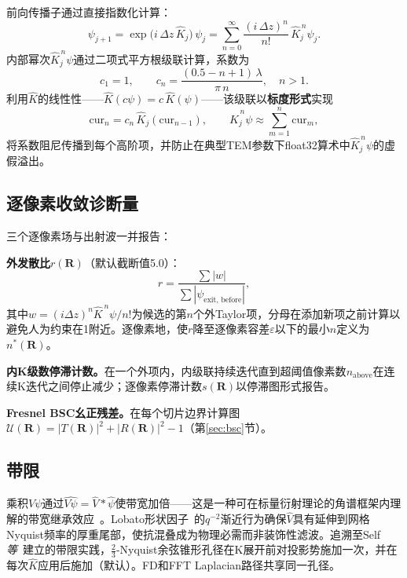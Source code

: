 \documentclass[twoside,11pt]{ctexart}
\begin{document}
前向传播子通过直接指数化计算：
\begin{equation}\label{eq:taylor}
\psi_{j+1}=\exp\!\big(i\,\Delta z\,\hat{K}_j\big)\,\psi_j
=\sum_{n=0}^{\infty}\frac{(i\,\Delta z)^n}{n!}\,\hat{K}_j^{\,n}\psi_j.
\end{equation}
内部幂次$\hat{K}_j^{\,n}\psi$通过二项式平方根级联计算，系数为
\begin{equation}\label{eq:cn}
c_1=1,\qquad c_n=\frac{(0.5-n+1)\,\lambda}{\pi\,n},\quad n>1.
\end{equation}
利用$\hat{K}$的线性性——$\hat{K}(c\psi)=c\,\hat{K}(\psi)$——该级联以\textbf{标度形式}实现
\begin{equation}\label{eq:cascade}
\mathrm{cur}_n=c_n\,\hat{K}_j(\mathrm{cur}_{n-1}),\qquad
\hat{K}_j^{\,n}\psi\approx\sum_{m=1}^{n}\mathrm{cur}_m,
\end{equation}
将系数阻尼传播到每个高阶项，并防止在典型TEM参数下float32算术中$\hat{K}_j^{\,n}\psi$的虚假溢出。

\subsection{逐像素收敛诊断量}

三个逐像素场与出射波一并报告：

\textbf{外发散比}$r(\mathbf{R})$（默认截断值5.0）：
\begin{equation}\label{eq:divergence-ratio}
r=\frac{\sum|w|}{\sum|\psi_{\text{exit, before}}|},
\end{equation}
其中$w=(i\Delta z)^n\hat{K}^{\,n}\psi/n!$为候选的第$n$个外Taylor项，分母在添加新项之前计算以避免人为约束在1附近。逐像素地，使$r$降至逐像素容差$\varepsilon$以下的最小$n$定义为$n^*(\mathbf{R})$。

\textbf{内K级数停滞计数。}在一个外项内，内级联持续迭代直到超阈值像素数$n_\text{above}$在连续K迭代之间停止减少；逐像素停滞计数$s(\mathbf{R})$以停滞图形式报告。

\textbf{Fresnel BSC幺正残差。}在每个切片边界计算图$\mathcal{U}(\mathbf{R})=|T(\mathbf{R})|^2+|R(\mathbf{R})|^2-1$（第\ref{sec:bsc}节）。

\subsection{带限}\label{sec:bandlimiting}

乘积$V\psi$通过$\widehat{V\psi}=\hat V*\hat\psi$使带宽加倍——这是一种可在标量衍射理论的角谱框架内理解的带宽继承效应~\cite{Goodman2017}。Lobato形状因子~\cite{LobatoVanDyck2014}的$q^{-2}$渐近行为确保$\hat V$具有延伸到网格Nyquist频率的厚重尾部，使抗混叠成为物理必需而非装饰性滤波。追溯至Self\textit{等}~\cite{Self1983}建立的带限实践，$\tfrac23$-Nyquist余弦锥形孔径在K展开前对投影势施加一次，并在每次$\hat{K}$应用后施加（默认）。FD和FFT Laplacian路径共享同一孔径。
\end{document}
